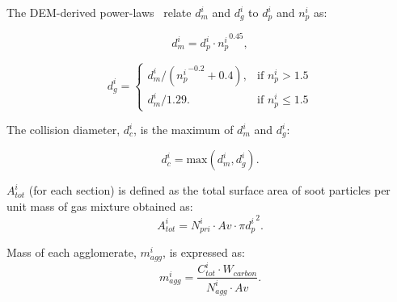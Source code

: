 The DEM-derived power-laws~\citep{Kelesidis2017} relate ${d^i_m}$ and ${d^i_g}$ to ${d^i_p}$ and ${n^i_p}$ as:

\begin{equation}
	d^i_{m} = d^i_p\cdot {n^i_p}^{0.45}
	\label{eqn:d_m},
\end{equation}

\begin{equation}
	d^i_g = 
	\left\{
	\begin{array}{lr}
		d^i_m/({n^i_p}^{-0.2}+0.4), & \text{if } n^i_p > 1.5\\
		d^i_m/1.29. & \text{if } n^i_p\leq 1.5
	\end{array}
	\right.
	\label{eqn:d_g}
\end{equation}

The collision diameter, ${d^i_c}$, is the maximum of ${d^i_{m}}$ and ${d^i_{g}}$:

\begin{equation}
	d^i_c = \mathrm{max}\left(d^i_m, d^i_g\right).
	\label{eqn:d_c}
\end{equation}

$A^i_{tot}$ (for each section) is defined as the total surface area of soot particles per unit mass of gas mixture obtained as:
\begin{equation}
	A^i_{tot} = N^i_{pri}\cdot Av\cdot \pi {d^i_p}^2
	\label{eqn:Atot}.
\end{equation}

Mass of each agglomerate, $m^i_{agg}$, is expressed as:
\begin{equation}
	m^i_{agg} = \frac{C^i_{tot}\cdot W_{carbon}}{N^i_{agg}\cdot Av}.
	\label{eqn:m_agg}
\end{equation}





